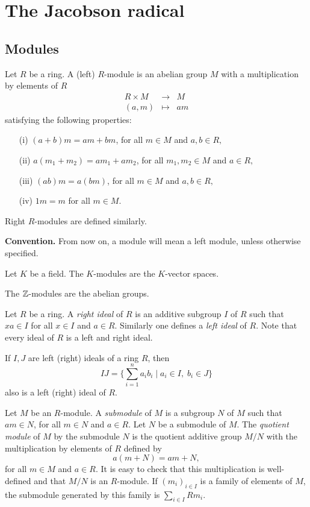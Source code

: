 \chapter{The Jacobson radical}
\label{radical}

\section*{Modules}

Let $R$ be a ring. A (left) $R$-module is an abelian group $M$ with a multiplication by elements of $R$
$$\begin{array}{ccc} R\times M&\rightarrow &M\\
(a,m)&\mapsto & am
\end{array}$$
satisfying the following properties:
\begin{itemize}
	\item[(i)] $(a+b)m=am+bm$, for all $m\in M$ and $a,b\in R,$
    \item[(ii)] $a(m_1+m_2)=am_1+am_2$, for all $m_1,m_2\in M$ and $a\in R,$
    \item[(iii)] $(ab)m=a(bm)$, for all $m\in M$ and $a,b\in R,$
    \item[(iv)] $1m=m$ for all $m\in M.$
\end{itemize}
Right $R$-modules are defined similarly.
\bigskip

{\bf Convention.} From now on, a module will mean a left module, unless otherwise specified. 
\bigskip

\begin{example}
	Let $K$ be a field. The  $K$-modules are the $K$-vector spaces.
	\end{example}
\begin{example}
The $\mathbb{Z}$-modules are the abelian groups.
\end{example}

Let $R$ be a ring. A {\em right ideal} of $R$ is an additive subgroup $I$ of $R$ such that $xa\in I$ for all $x\in I$ and $a\in R$.
Similarly one defines a {\em left ideal} of $R$. Note that every ideal of $R$ is a left and right ideal.

If $I,J$ are left (right) ideals of a ring $R$, then
$$IJ=\{ \sum_{i=1}^{n} a_ib_i\mid a_i\in I,\; b_i\in J\}$$
also is a left (right) ideal of $R$.

Let $M$ be an $R$-module. A {\em submodule} of $M$ is a subgroup $N$ of $M$
such that $am\in N$, for all $m\in N$ and $a\in R$. Let $N$ be a submodule of $M$. The {\em quotient module} 
of $M$ by the submodule $N$ is
the quotient additive group $M/N$ with the multiplication by elements of $R$ defined by
$$a(m+N)=am+N,$$
for all $m\in M$ and $a\in R$.
It is easy to check that this multiplication is well-defined and that 
$M/N$ is an $R$-module. If $(m_i)_{i\in I}$ is a family of elements of $M$, the submodule generated by this family is 
$\sum_{i \in I}Rm_i$.

